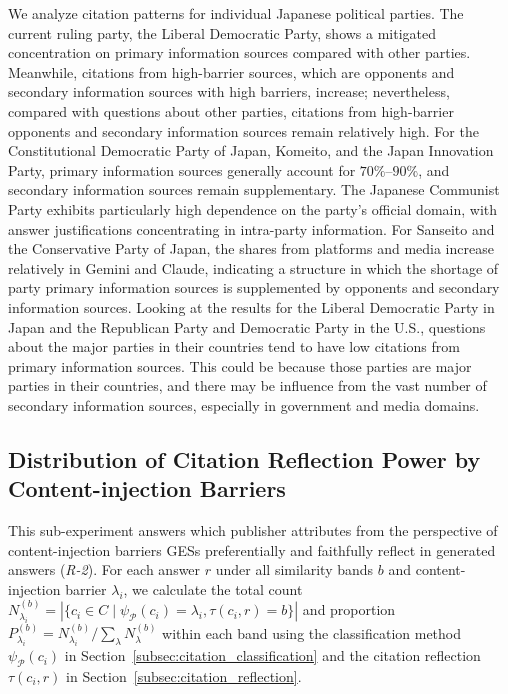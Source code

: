 We analyze citation patterns for individual Japanese political parties.
The current ruling party, the Liberal Democratic Party, shows a mitigated concentration on primary information sources compared with other parties.
Meanwhile, citations from high-barrier sources, which are opponents and secondary information sources with high barriers, increase; nevertheless, compared with questions about other parties, citations from high-barrier opponents and secondary information sources remain relatively high.
For the Constitutional Democratic Party of Japan, Komeito, and the Japan Innovation Party, primary information sources generally account for \(70\%\)--\(90\%\), and secondary information sources remain supplementary.
The Japanese Communist Party exhibits particularly high dependence on the party's official domain, with answer justifications concentrating in intra-party information.
For Sanseito and the Conservative Party of Japan, the shares from platforms and media increase relatively in Gemini and Claude, indicating a structure in which the shortage of party primary information sources is supplemented by opponents and secondary information sources.
Looking at the results for the Liberal Democratic Party in Japan and the Republican Party and Democratic Party in the U.S., questions about the major parties in their countries tend to have low citations from primary information sources.
This could be because those parties are major parties in their countries, and there may be influence from the vast number of secondary information sources, especially in government and media domains.



\subsection{Distribution of Citation Reflection Power by Content-injection Barriers}
This sub-experiment answers which publisher attributes from the perspective of content-injection barriers GESs preferentially and faithfully reflect in generated answers (\emph{R-2}).
For each answer \( r \) under all similarity bands \( b \) and content-injection barrier \( \lambda_i \), we calculate the total count \( N^{(b)}_{\lambda_i} = |\{c_i \in C \mid \psi_{\mathcal{P}}(c_i) = \lambda_i, \tau(c_i, r) = b\}| \) and proportion \( P^{(b)}_{\lambda_i} = N^{(b)}_{\lambda_i}/\sum_{\lambda} N^{(b)}_{\lambda} \) within each band using the classification method \(\psi_{\mathcal{P}}(c_i)\) in Section~\ref{subsec:citation_classification} and the citation reflection \(\tau(c_i, r)\) in Section~\ref{subsec:citation_reflection}.

